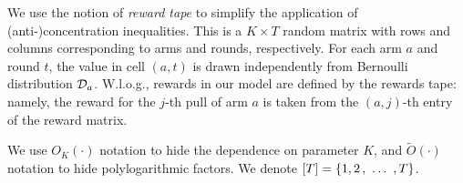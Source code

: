 We use the notion of \emph{reward tape} to simplify the application of (anti-)concentration inequalities. This is a $K\times T$ random matrix with rows and columns corresponding to arms and rounds, respectively. For each arm $a$ and round $t$, the value in cell $(a,t)$ is drawn independently from Bernoulli distribution $\mathcal{D}_a$. W.l.o.g., rewards in our model are defined by the rewards tape: namely, the reward for the $j$-th pull of arm $a$ is taken from the $(a,j)$-th entry of the reward matrix.

We use $O_K(\cdot)$ notation to hide the dependence on parameter $K$, and $\tilde O(\cdot)$ notation to hide polylogarithmic factors. We denote $[T]= \{1,2 \, ,\ \ldots\ , T\}$.



